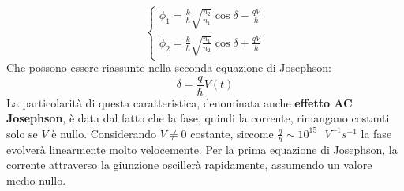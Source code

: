 \begin{equation*}
    \begin{cases}
        \dot{\phi}_1=\frac{k}{\hbar}\sqrt{\frac{n_2}{n_1}}\cos\delta-\frac{qV}{\hbar} \\
        \dot{\phi}_2=\frac{k}{\hbar}\sqrt{\frac{n_1}{n_2}}\cos\delta+\frac{qV}{\hbar}
    \end{cases}
\end{equation*}
Che possono essere riassunte nella seconda equazione di Josephson:
\begin{equation*}
    \dot{\delta}=\frac{q}{\hbar}V(t)
\end{equation*}
La particolarità di questa caratteristica, denominata anche \textbf{effetto AC Josephson}, è data dal fatto che la fase, quindi la corrente, rimangano costanti solo se $V$ è nullo. Considerando $V\neq0$ costante, siccome $\frac q \hbar\sim 10^{15}\text{ }V^{-1}s^{-1}$  la fase evolverà linearmente molto velocemente. Per la prima equazione di Josephson, la corrente attraverso la giunzione oscillerà rapidamente, assumendo un valore medio nullo.

